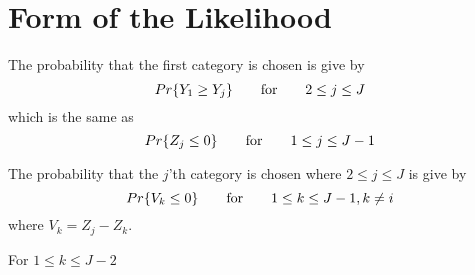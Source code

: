 \section{Form of the Likelihood}

The probability that the first category is chosen is give by 
$$Pr\{Y_1\ge Y_j\} \qquad \hbox{\rm for} \qquad 2\le j\le J$$
which is the same as 
$$Pr\{Z_j\le 0\} \qquad \hbox{\rm for} \qquad 1\le j\le J-1$$

The probability that the $j$'th  category is chosen where 
$2\le j\le J$ is  give by 
$$Pr\{V_k\le 0\} \qquad \hbox{\rm for} \qquad 1\le k\le J-1, 
  k\ne i$$
where $V_k=Z_j-Z_k$.

For $1\le k\le J-2$

